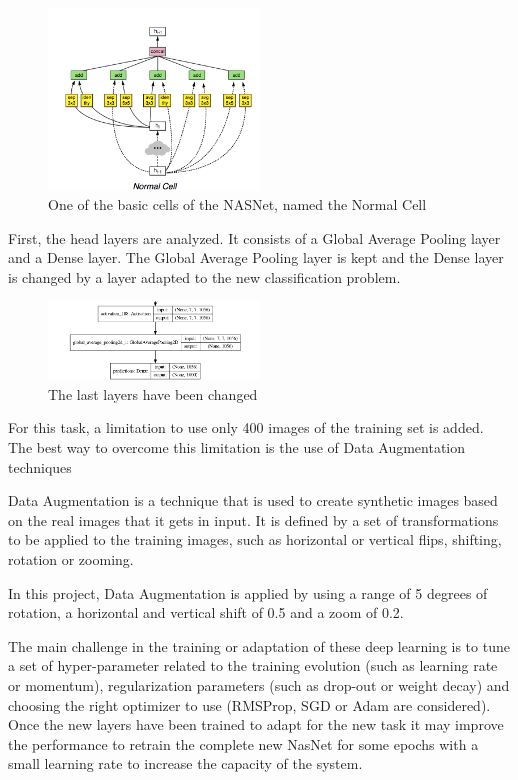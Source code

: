 \documentclass[runningheads]{llncs}
\begin{document}
\begin{figure}[ht!]
  \centering
  \includegraphics[width=0.5\textwidth]{NasNet.png}\hfill
  \caption{One of the basic cells of the NASNet, named the Normal Cell}
\end{figure}

First, the head layers are analyzed. It consists of a Global Average Pooling layer and a Dense layer. The Global Average Pooling layer is kept and the Dense layer is changed by a layer adapted to the new classification problem.

\begin{figure}[ht!]
  \centering
  \includegraphics[width=0.5\textwidth]{last-layers.png}\hfill
  \caption{The last layers have been changed}
\end{figure}

For this task, a limitation to use only 400 images of the training set is added. The best way to overcome this limitation is the use of Data Augmentation techniques \cite{Shorten2019ASO}

Data Augmentation is a technique that is used to create synthetic images based on the real images that it gets in input. It is defined by a set of transformations to be applied to the training images, such as horizontal or vertical flips, shifting, rotation or zooming.

In this project, Data Augmentation is applied by using a range of 5 degrees of rotation, a horizontal and vertical shift of 0.5 and a zoom of 0.2.

The main challenge in the training or adaptation of these deep learning is to tune a set of hyper-parameter related to the training evolution (such as learning rate or momentum), regularization parameters (such as drop-out or weight decay) and choosing the right optimizer to use (RMSProp, SGD or Adam are considered). Once the new layers have been trained to adapt for the new task it may improve the performance to retrain the complete new NasNet for some epochs with a small learning rate to increase the capacity of the system.
\end{document}
